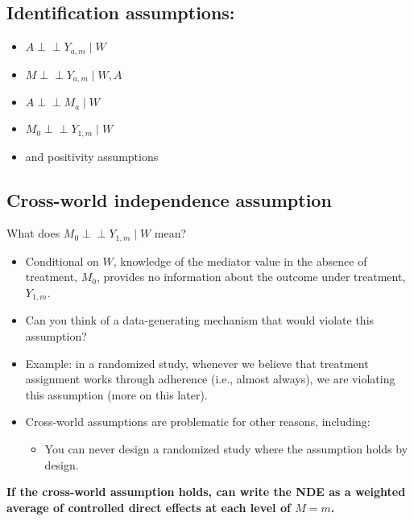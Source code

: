 \documentclass[
  12pt,
]{book}
\providecommand{\tightlist}{%
  \setlength{\itemsep}{0pt}\setlength{\parskip}{0pt}}
\theoremstyle{definition}
\theoremstyle{definition}
\theoremstyle{definition}
\newcommand{\indep}{\mbox{$\perp\!\!\!\perp$}}
\newcommand{\1}{\mathbbm{1}}
\begin{document}
\hypertarget{identification-assumptions-1}{%
\subsection{Identification assumptions:}\label{identification-assumptions-1}}

\begin{itemize}
\tightlist
\item
  \(A \indep Y_{a,m} \mid W\)
\item
  \(M \indep Y_{a,m} \mid W, A\)
\item
  \(A \indep M_a \mid W\)
\item
  \(M_0 \indep Y_{1,m} \mid W\)
\item
  and positivity assumptions
\end{itemize}

\hypertarget{cross-world-independence-assumption}{%
\subsection{Cross-world independence assumption}\label{cross-world-independence-assumption}}

What does \(M_0 \indep Y_{1,m} \mid W\) mean?

\begin{itemize}
\tightlist
\item
  Conditional on \(W\), knowledge of the mediator value in the absence of
  treatment, \(M_0\),
  provides no information about the outcome under treatment, \(Y_{1,m}\).
\item
  Can you think of a data-generating mechanism that would violate this
  assumption?
\item
  Example: in a randomized study, whenever we believe that treatment assignment
  works through adherence (i.e., almost
  always), we are violating this assumption (more on this later).
\item
  Cross-world assumptions are problematic for other reasons, including:

  \begin{itemize}
  \tightlist
  \item
    You can never design a randomized study where the assumption holds by
    design.
  \end{itemize}
\end{itemize}

\textbf{If the cross-world assumption holds, can write the NDE as a weighted average
of controlled direct effects at each level of \(M=m\).}
\end{document}
